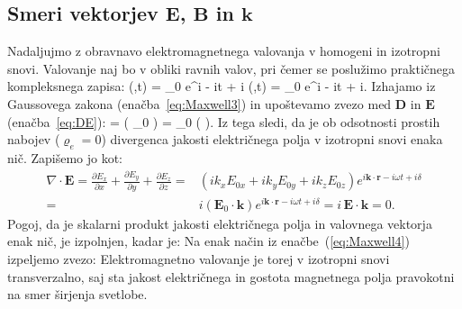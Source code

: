 \subsection*{Smeri vektorjev $\mathbf{E}$, $\mathbf{B}$ in $\mathbf{k}$}
Nadaljujmo z obravnavo elektromagnetnega valovanja v homogeni in izotropni snovi. 
Valovanje naj bo v obliki ravnih valov, pri čemer se poslužimo praktičnega kompleksnega zapisa:
\beq
{}(,t) = _0 e^{i\cdot {} - i\omega t + i\delta}
\qquad {} \qquad
{}(,t) = _0 e^{i\cdot {} - i\omega t + i\delta}.
\label{eq:ravnivalkompleks}
\eeq
Izhajamo iz Gaussovega zakona (enačba~\ref{eq:Maxwell3}) in upoštevamo zvezo med 
$\mathbf{D}$ in $\mathbf{E}$ (enačba~\ref{eq:DE}): 
\beq
\nabla \cdot {} = \nabla \cdot \left( \varepsilon \varepsilon_0 \right) 
= \varepsilon \varepsilon_0 \left(\nabla \cdot {} \right).
\label{eq:03_20}
\eeq
Iz tega sledi, da je ob odsotnosti prostih nabojev ($\varrho_{e} = 0$) divergenca 
jakosti električnega polja v izotropni snovi enaka nič.
Zapišemo jo kot:
\begin{align}
\nabla \cdot \mathbf{E} = \frac{\partial E_x}{\partial x}+ \frac{\partial E_y}{\partial y}+
\frac{\partial E_z}{\partial z} =& \left(ik_xE_{0x} + ik_yE_{0y} + ik_zE_{0z}\right)
e^{i\mathbf{k}\cdot \mathbf{r} - i\omega t + i\delta}\nonumber\\
=& i \left( \mathbf{E}_0 \cdot \mathbf{k} \right) e^{i\mathbf{k}\cdot \mathbf{r} - i\omega t + i\delta} = 
i\, \mathbf{E} \cdot \mathbf{k} = 0.
\label{eq:03_21}
\end{align}
Pogoj, da je skalarni produkt jakosti električnega polja in valovnega vektorja enak nič, 
je izpolnjen, kadar je:
Na enak način iz enačbe~(\ref{eq:Maxwell4}) izpeljemo zvezo:
Elektromagnetno valovanje je torej v izotropni snovi transverzalno, saj sta jakost
električnega in gostota magnetnega polja pravokotni na smer širjenja svetlobe.

